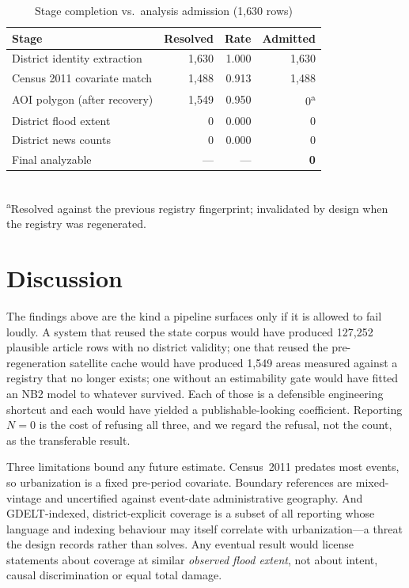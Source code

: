 \documentclass[conference]{IEEEtran}
\begin{document}
\begin{table}[t]
\caption{Stage completion vs.\ analysis admission (1{,}630 rows)}
\label{tab:qc}
\centering
\begin{tabular}{lrrr}
\toprule
Stage & Resolved & Rate & Admitted \\
\midrule
District identity extraction   & 1{,}630 & 1.000 & 1{,}630 \\
Census 2011 covariate match    & 1{,}488 & 0.913 & 1{,}488 \\
AOI polygon (after recovery)   & 1{,}549 & 0.950 & 0\textsuperscript{a} \\
District flood extent          & 0       & 0.000 & 0 \\
District news counts           & 0       & 0.000 & 0 \\
\midrule
Final analyzable               & ---     & ---   & \textbf{0} \\
\bottomrule
\end{tabular}
\\[2pt]
\footnotesize\textsuperscript{a}Resolved against the previous registry
fingerprint; invalidated by design when the registry was regenerated.
\end{table}

\section{Discussion}
The findings above are the kind a pipeline surfaces only if it is allowed to
fail loudly. A system that reused the state corpus would have produced 127{,}252
plausible article rows with no district validity; one that reused the
pre-regeneration satellite cache would have produced 1{,}549 areas measured
against a registry that no longer exists; one without an estimability gate would
have fitted an NB2 model to whatever survived. Each of those is a defensible
engineering shortcut and each would have yielded a publishable-looking
coefficient. Reporting $N=0$ is the cost of refusing all three, and we regard
the refusal, not the count, as the transferable result.

Three limitations bound any future estimate. Census~2011 predates most events,
so urbanization is a fixed pre-period covariate. Boundary references are
mixed-vintage and uncertified against event-date administrative geography. And
GDELT-indexed, district-explicit coverage is a subset of all reporting whose
language and indexing behaviour may itself correlate with urbanization---a
threat the design records rather than solves. Any eventual result would license
statements about coverage at similar \emph{observed flood extent}, not about
intent, causal discrimination or equal total damage.
\end{document}
